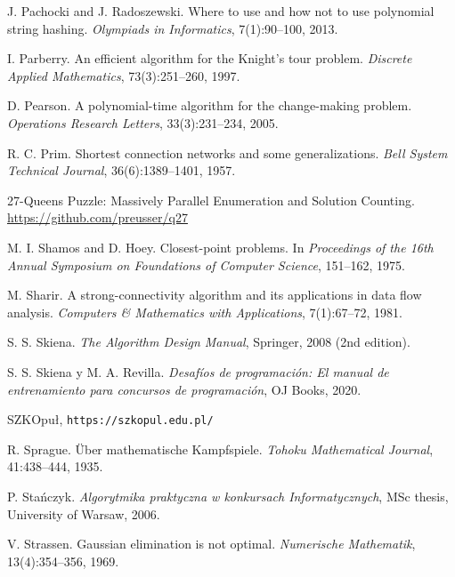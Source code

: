 \begin{thebibliography}{9}
  J. Pachocki and J. Radoszewski.
  Where to use and how not to use polynomial string hashing.
  \emph{Olympiads in Informatics}, 7(1):90--100, 2013.

  I. Parberry.
  An efficient algorithm for the Knight's tour problem.
  \emph{Discrete Applied Mathematics}, 73(3):251--260, 1997.


  D. Pearson.
  A polynomial-time algorithm for the change-making problem.
  \emph{Operations Research Letters}, 33(3):231--234, 2005.

  R. C. Prim.
  Shortest connection networks and some generalizations.
  \emph{Bell System Technical Journal}, 36(6):1389--1401, 1957.


  27-Queens Puzzle: Massively Parallel Enumeration and Solution Counting.
  \url{https://github.com/preusser/q27}

  M. I. Shamos and D. Hoey.
  Closest-point problems.
  In \emph{Proceedings of the 16th Annual Symposium on Foundations of Computer Science}, 151--162, 1975.

  M. Sharir.
  A strong-connectivity algorithm and its applications in data flow analysis.
  \emph{Computers \& Mathematics with Applications}, 7(1):67--72, 1981.

  S. S. Skiena.
  \emph{The Algorithm Design Manual}, Springer, 2008 (2nd edition).

  S. S. Skiena y M. A. Revilla.
  \emph{Desafíos de programación: El manual de entrenamiento para concursos de programación},
  OJ Books, 2020.

  SZKOpuł, \texttt{https://szkopul.edu.pl/}

  R. Sprague.
  Über mathematische Kampfspiele.
  \emph{Tohoku Mathematical Journal}, 41:438--444, 1935.

  P. Stańczyk.
  \emph{Algorytmika praktyczna w konkursach Informatycznych},
  MSc thesis, University of Warsaw, 2006.

  V. Strassen.
  Gaussian elimination is not optimal.
  \emph{Numerische Mathematik}, 13(4):354--356, 1969.


\end{thebibliography}
